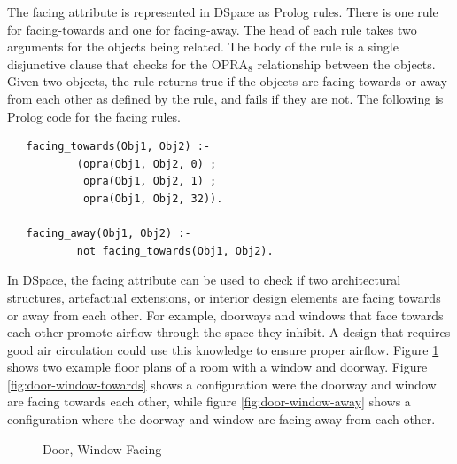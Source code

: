 \documentclass[12pt]{ucthesis}
\begin{document}
The facing attribute is represented in DSpace as Prolog rules. There is one rule for facing-towards and one for facing-away. The head of each rule takes two arguments for the objects being related. The body of the rule is a single disjunctive clause that checks for the OPRA$_{8}$ relationship between the objects. Given two objects, the rule returns true if the objects are facing towards or away from each other as defined by the rule, and fails if they are not. The following is Prolog code for the facing rules.

\begin{verbatim}
   facing_towards(Obj1, Obj2) :- 
           (opra(Obj1, Obj2, 0) ;
            opra(Obj1, Obj2, 1) ;
            opra(Obj1, Obj2, 32)).
                                 
   facing_away(Obj1, Obj2) :- 
           not facing_towards(Obj1, Obj2).                     
\end{verbatim}

In DSpace, the facing attribute can be used to check if two architectural structures, artefactual extensions, or interior design elements are facing towards or away from each other. For example, doorways and windows that face towards each other promote airflow through the space they inhibit. A design that requires good air circulation could use this knowledge to ensure proper airflow. Figure \ref{door-window-facing} shows two example floor plans of a room with a window and doorway. Figure \ref{fig:door-window-towards} shows a configuration were the doorway and window are facing towards each other, while figure \ref{fig:door-window-away} shows a configuration where the doorway and window are facing away from each other. 

\begin{figure}[H]
 \centering
  \hspace{10 mm}
 \caption{Door, Window Facing}
\label{door-window-facing}
\end{figure}
\end{document}
